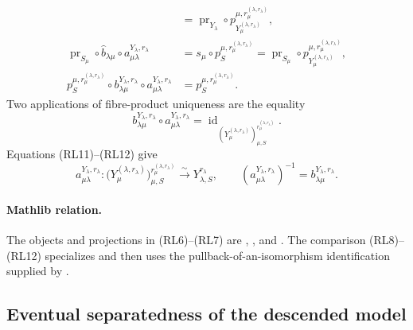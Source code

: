 \begin{definition}
\[\begin{aligned}
      &=\operatorname{pr}_{Y_\lambda}\circ
        p_{Y_\mu^{(\lambda,r_\lambda)}}^
          {\mu,r_\mu^{(\lambda,r_\lambda)}},\\
    \operatorname{pr}_{S_\mu}\circ\widehat b_{\lambda\mu}\circ
      a_{\mu\lambda}^{Y_\lambda,r_\lambda}
      &=s_\mu\circ p_S^{\mu,r_\mu^{(\lambda,r_\lambda)}}
       =\operatorname{pr}_{S_\mu}\circ
        p_{Y_\mu^{(\lambda,r_\lambda)}}^
          {\mu,r_\mu^{(\lambda,r_\lambda)}},\\
    p_S^{\mu,r_\mu^{(\lambda,r_\lambda)}}\circ
      b_{\lambda\mu}^{Y_\lambda,r_\lambda}\circ
      a_{\mu\lambda}^{Y_\lambda,r_\lambda}
      &=p_S^{\mu,r_\mu^{(\lambda,r_\lambda)}}.
  \end{aligned}
  \]
  Two applications of fibre-product uniqueness are the equality
  \[
    b_{\lambda\mu}^{Y_\lambda,r_\lambda}\circ
      a_{\mu\lambda}^{Y_\lambda,r_\lambda}
      =\operatorname{id}_{
        (Y_\mu^{(\lambda,r_\lambda)})_{
          \mu,S}^{r_\mu^{(\lambda,r_\lambda)}}}.                  \tag{RL12}
  \]
  Equations (RL11)--(RL12) give
  \[
    a_{\mu\lambda}^{Y_\lambda,r_\lambda}\colon
      \bigl(Y_\mu^{(\lambda,r_\lambda)}\bigr)_{
        \mu,S}^{r_\mu^{(\lambda,r_\lambda)}}
        \xrightarrow{\sim}Y_{\lambda,S}^{r_\lambda},
    \qquad
    (a_{\mu\lambda}^{Y_\lambda,r_\lambda})^{-1}
      =b_{\lambda\mu}^{Y_\lambda,r_\lambda}.
  \]

  \paragraph{Mathlib relation.}
  The objects and projections in (RL6)--(RL7) are
  \texttt{},
  \texttt{}, and
  \texttt{}.  The comparison
  (RL8)--(RL12) specializes
  \texttt{} and then uses
  the pullback-of-an-isomorphism identification supplied by
  \texttt{}.
\end{definition}

\subsection{Eventual separatedness of the descended model}

